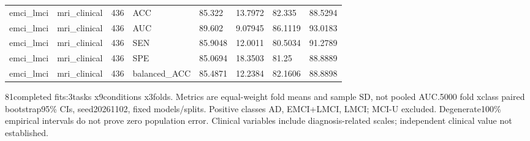 \begin{landscape}
\begin{longtable}{llllllll}
emci\_lmci & mri\_clinical & 436 & ACC & 85.322 & 13.7972 & 82.335 & 88.5294 \\
emci\_lmci & mri\_clinical & 436 & AUC & 89.602 & 9.07945 & 86.1119 & 93.0183 \\
emci\_lmci & mri\_clinical & 436 & SEN & 85.9048 & 12.0011 & 80.5034 & 91.2789 \\
emci\_lmci & mri\_clinical & 436 & SPE & 85.0694 & 18.3503 & 81.25 & 88.8889 \\
emci\_lmci & mri\_clinical & 436 & balanced\_ACC & 85.4871 & 12.2384 & 82.1606 & 88.8898 \\
\end{longtable}
\noindent\parbox{\linewidth}{\footnotesize 81completed fits:3tasks x9conditions x3folds. Metrics are equal-weight fold means and sample SD, not pooled AUC.5000 fold xclass paired bootstrap95\% CIs, seed20261102, fixed models/splits. Positive classes AD, EMCI+LMCI, LMCI; MCI-U excluded. Degenerate100\% empirical intervals do not prove zero population error. Clinical variables include diagnosis-related scales; independent clinical value not established.}
\endgroup
\end{landscape}
